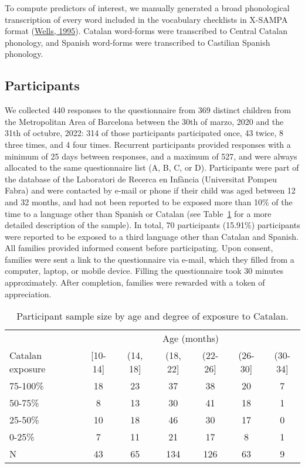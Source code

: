 \documentclass[
]{article}
\begin{document}
To compute predictors of interest, we manually generated a broad
phonological transcription of every word included in the vocabulary
checklists in X-SAMPA format
(\protect\hyperlink{ref-wells1995computercoding}{Wells, 1995}). Catalan
word-forms were transcribed to Central Catalan phonology, and Spanish
word-forms were transcribed to Castilian Spanish phonology.

\hypertarget{sec-participants}{%
\subsection{Participants}\label{sec-participants}}

We collected 440 responses to the questionnaire from 369 distinct
children from the Metropolitan Area of Barcelona between the 30th of
marzo, 2020 and the 31th of octubre, 2022: 314 of those participants
participated once, 43 twice, 8 three times, and 4 four times. Recurrent
participants provided responses with a minimum of 25 days between
responses, and a maximum of 527, and were always allocated to the same
questionnaire list (A, B, C, or D). Participants were part of the
database of the Laboratori de Recerca en Infància (Universitat Pompeu
Fabra) and were contacted by e-mail or phone if their child was aged
between 12 and 32 months, and had not been reported to be exposed more
than 10\% of the time to a language other than Spanish or Catalan (see
Table~\ref{tbl-participants} for a more detailed description of the
sample). In total, 70 participants (15.91\%) participants were reported
to be exposed to a third language other than Catalan and Spanish. All
families provided informed consent before participating. Upon consent,
families were sent a link to the questionnaire via e-mail, which they
filled from a computer, laptop, or mobile device. Filling the
questionnaire took 30 minutes approximately. After completion, families
were rewarded with a token of appreciation.

\hypertarget{tbl-participants}{}
\begin{table}
\caption{\label{tbl-participants}Participant sample size by age and degree of exposure to Catalan. }\tabularnewline

\centering
\begin{tabular}{lcccccc}
\toprule
\multicolumn{1}{c}{ } & \multicolumn{6}{c}{Age (months)} \\
\cmidrule(l{3pt}r{3pt}){2-7}
Catalan exposure & {}[10-14] & (14, 18] & (18, 22] & (22-26] & (26-30] & (30-34]\\
\midrule
75-100\% & 18 & 23 & 37 & 38 & 20 & 7\\
50-75\% & 8 & 13 & 30 & 41 & 18 & 1\\
25-50\% & 10 & 18 & 46 & 30 & 17 & 0\\
0-25\% & 7 & 11 & 21 & 17 & 8 & 1\\
\midrule
N & 43 & 65 & 134 & 126 & 63 & 9\\
\bottomrule
\end{tabular}
\end{table}
\end{document}

